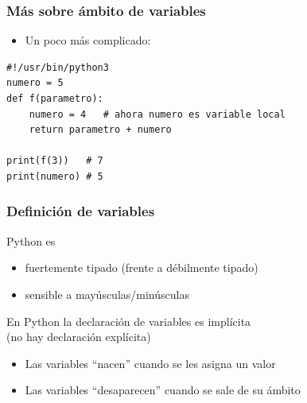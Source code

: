 \documentclass{beamer}
\begin{document}
\begin{frame}[fragile]
\frametitle{Más sobre ámbito de variables}
\begin{itemize}
  
\item  Un poco más complicado:

\end{itemize}


  \begin{footnotesize}
\begin{verbatim}
#!/usr/bin/python3
numero = 5
def f(parametro):
    numero = 4   # ahora numero es variable local
    return parametro + numero
    
print(f(3))   # 7
print(numero) # 5

\end{verbatim}
  \end{footnotesize}

\end{frame}




\begin{frame}
\frametitle{Definición de variables}

Python es
\begin{itemize}
\item fuertemente tipado (frente a débilmente tipado)
\item sensible a mayúsculas/minúsculas
\end{itemize}



En Python la declaración de variables es implícita \\(no hay declaración explícita)
\begin{itemize}
\item Las variables ``nacen'' cuando se les asigna un valor
\item Las variables ``desaparecen'' cuando se sale de su ámbito
\end{itemize}  
\end{frame}
\end{document}
